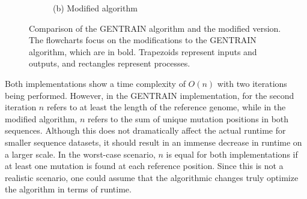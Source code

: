 \begin{figure}[ht]
\begin{subfigure}[b]{0.49\textwidth}
    \caption*{(b) Modified algorithm}
  \end{subfigure}
\caption[Comparison of the GENTRAIN algorithm and the modified version]{Comparison of the GENTRAIN algorithm and the modified version. The flowcharts focus on the modifications to the GENTRAIN algorithm, which are in bold. Trapezoids represent inputs and outputs, and rectangles represent processes.}
\label{fig:algorithm_comparison}
\end{figure}

Both implementations show a time complexity of $O(n)$ with two iterations being performed. However, in the GENTRAIN implementation, for the second iteration $n$ refers to at least the length of the reference genome, while in the modified algorithm, $n$ refers to the sum of unique mutation positions in both sequences. Although this does not dramatically affect the actual runtime for smaller sequence datasets, it should result in an immense decrease in runtime on a larger scale. In the worst-case scenario, $n$ is equal for both implementations if at least one mutation is found at each reference position. Since this is not a realistic scenario, one could assume that the algorithmic changes truly optimize the algorithm in terms of runtime.

